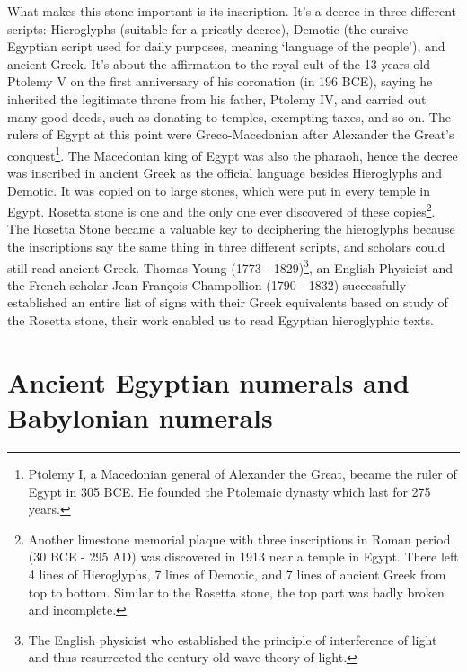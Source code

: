 \documentclass[b5paper]{article}
\begin{document}
What makes this stone important is its inscription. It's a decree in three different scripts: Hieroglyphs (suitable for a priestly decree), Demotic (the cursive Egyptian script used for daily purposes, meaning `language of the people'), and ancient Greek. It's about the affirmation to the royal cult of the 13 years old Ptolemy V on the first anniversary of his coronation (in 196 BCE), saying he inherited the legitimate throne from his father, Ptolemy IV, and carried out many good deeds, such as donating to temples, exempting taxes, and so on. The rulers of Egypt at this point were Greco-Macedonian after Alexander the Great's conquest\footnote{Ptolemy I, a Macedonian general of Alexander the Great, became the ruler of Egypt in 305 BCE. He founded the Ptolemaic dynasty which last for 275 years.}. The Macedonian king of Egypt was also the pharaoh, hence the decree was inscribed in ancient Greek as the official language besides Hieroglyphs and Demotic. It was copied on to large stones, which were put in every temple in Egypt. Rosetta stone is one and the only one ever discovered of these copies\footnote{Another limestone memorial plaque with three inscriptions in Roman period (30 BCE - 295 AD) was discovered in 1913 near a temple in Egypt. There left 4 lines of Hieroglyphs, 7 lines of Demotic, and 7 lines of ancient Greek from top to bottom. Similar to the Rosetta stone, the top part was badly broken and incomplete\cite{SH-Museum-24}.}. The Rosetta Stone became a valuable key to deciphering the hieroglyphs because the inscriptions say the same thing in three different scripts, and scholars could still read ancient Greek. Thomas Young (1773 - 1829)\footnote{The English physicist who established the principle of interference of light and thus resurrected the century-old wave theory of light.}, an English Physicist and the French scholar Jean-François Champollion (1790 - 1832) successfully established an entire list of signs with their Greek equivalents based on study of the Rosetta stone, their work enabled us to read Egyptian hieroglyphic texts\cite{BM-RS-17}.

\section{Ancient Egyptian numerals and Babylonian numerals}
\end{document}
